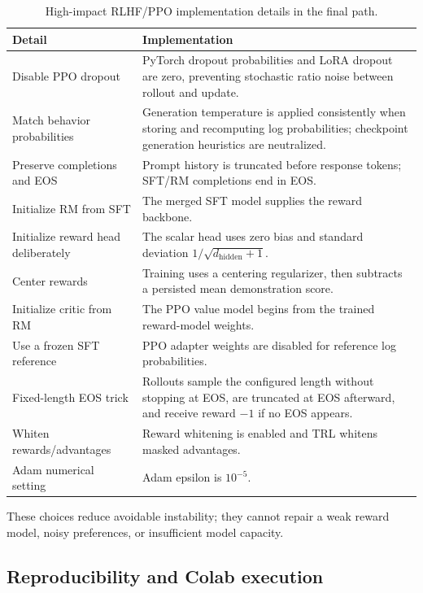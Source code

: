 \documentclass[11pt]{article}
\begin{document}
\begin{table}[H]
\centering
\small
\caption{High-impact RLHF/PPO implementation details in the final path.}
\label{tab:nplus}
\begin{tabularx}{\textwidth}{@{}p{}Y@{}}
\toprule
\textbf{Detail} & \textbf{Implementation}\\
\midrule
Disable PPO dropout &
PyTorch dropout probabilities and LoRA dropout are zero, preventing stochastic
ratio noise between rollout and update.\\
Match behavior probabilities &
Generation temperature is applied consistently when storing and recomputing
log probabilities; checkpoint generation heuristics are neutralized.\\
Preserve completions and EOS &
Prompt history is truncated before response tokens; SFT/RM completions end in
EOS.\\
Initialize RM from SFT &
The merged SFT model supplies the reward backbone.\\
Initialize reward head deliberately &
The scalar head uses zero bias and standard deviation
$1/\sqrt{d_{\mathrm{hidden}}+1}$.\\
Center rewards &
Training uses a centering regularizer, then subtracts a persisted mean
demonstration score.\\
Initialize critic from RM &
The PPO value model begins from the trained reward-model weights.\\
Use a frozen SFT reference &
PPO adapter weights are disabled for reference log probabilities.\\
Fixed-length EOS trick &
Rollouts sample the configured length without stopping at EOS, are truncated
at EOS afterward, and receive reward $-1$ if no EOS appears.\\
Whiten rewards/advantages &
Reward whitening is enabled and TRL whitens masked advantages.\\
Adam numerical setting &
Adam epsilon is $10^{-5}$.\\
\bottomrule
\end{tabularx}
\end{table}

These choices reduce avoidable instability; they cannot repair a weak reward
model, noisy preferences, or insufficient model capacity.

\subsection{Reproducibility and Colab execution}
\end{document}
